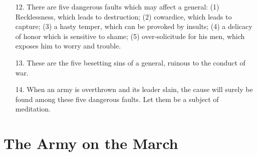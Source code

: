 \documentclass[11pt,openany]{memoir}
\newcommand{\enumeratemargin}{1.30em}
\begin{document}
\begin{enumerate}[leftmargin=\enumeratemargin]
\item[12.] There are five dangerous faults which may affect a general: (1) Recklessness, which leads to destruction; (2) cowardice, which leads to capture; (3) a hasty temper, which can be provoked by insults; (4) a delicacy of honor which is sensitive to shame; (5) over-solicitude for his men, which exposes him to worry and trouble.
\item[13.] These are the five besetting sins of a general, ruinous to the conduct of war.
\item[14.] When an army is overthrown and its leader slain, the cause will surely be found among these five dangerous faults. Let them be a subject of meditation.
\end{enumerate}

\chapter{The Army on the March}
\end{document}
